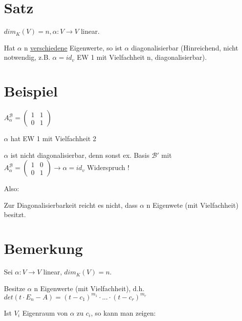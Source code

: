 \documentclass[a4paper, openany]{book}
\begin{document}
        \section{Satz}

        $dim_K(V) = n, \alpha : V \rightarrow V$ linear.

        Hat $\alpha$ n \underline{verschiedene} Eigenwerte, so ist $\alpha$ diagonalisierbar (Hinreichend, nicht notwendig, z.B. $\alpha = id_v$ EW 1 mit Vielfachheit n, diagonalisierbar).

        \section{Beispiel}

        $A_{\alpha}^{\mathcal{B}} = \begin{pmatrix}1 & 1 \\ 0 & 1 \end{pmatrix}$

        $\alpha$ hat EW 1 mit Vielfachheit 2

        \par \medskip

        $\alpha$ ist nicht diagonalisierbar, denn sonst ex. Basis $\mathcal{B'}$ mit $A_{\alpha}^{\mathcal{B}} = \begin{pmatrix}1 & 0 \\ 0 & 1 \end{pmatrix} \rightarrow \alpha = id_v$ Widerspruch !

        \par \medskip

        \par \medskip

        Also:

        Zur Diagonalisierbarkeit reicht es nicht, dass $\alpha$ n Eigenwete (mit Vielfachheit) besitzt.

        \section{Bemerkung}

        Sei $\alpha : V \rightarrow V$ linear, $dim_K(V) = n$.

        Besitze $\alpha$ n Eigenwerte (mit Vielfachheit), d.h. $det(t \cdot E_n -A) = (t-c_1)^{m_1} \cdot ... \cdot (t-c_r)^{m_r}$

        \par \medskip

        Ist $V_i$ Eigenraum von $\alpha$ zu $c_i$, so kann man zeigen: 
\end{document}

